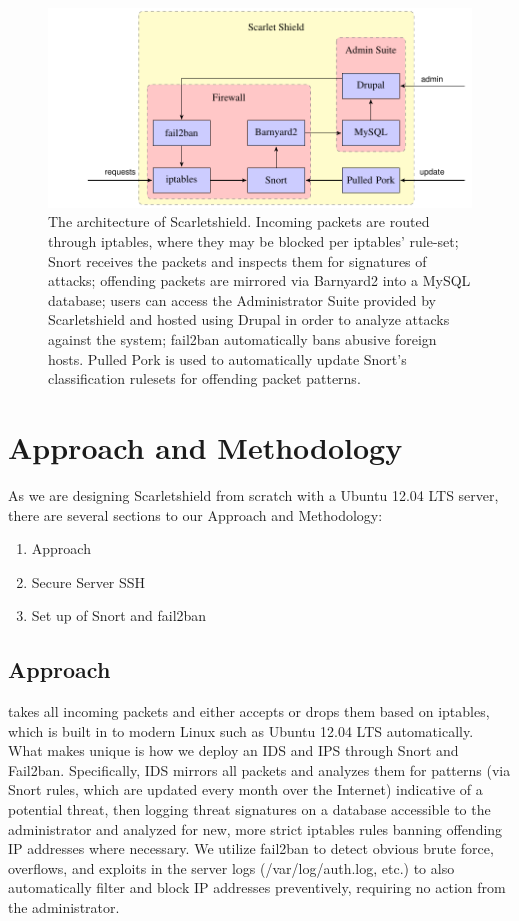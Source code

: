 \documentclass[12pt,letterpaper,titlepage]{report}
\begin{document}
{\begin{figure}[h]
\centering
  \includegraphics{./scarlet-shield-diagram2.pdf}
  \caption{The architecture of Scarletshield. Incoming packets are routed
  through iptables, where they may be blocked per iptables' rule-set; Snort receives
  the packets and inspects them for signatures of attacks; offending packets are 
  mirrored via Barnyard2 into a MySQL database; users can access the Administrator
  Suite provided by Scarletshield and hosted using Drupal in order to analyze
  attacks against the system; fail2ban automatically bans abusive foreign hosts. 
  Pulled Pork is used to automatically update Snort's classification rulesets
  for offending packet patterns.}
\end{figure}

\chapter{Approach and Methodology}

As we are designing Scarletshield from scratch with a Ubuntu 12.04 LTS server,
there are several sections to our Approach and Methodology:

\begin{enumerate}
\itemsep0em
\item Approach
\item Secure Server SSH
\item Set up of Snort and fail2ban
\end{enumerate}

\section{Approach}

\scarletshield takes all incoming packets and either accepts or drops them based
on iptables, which is built in to modern Linux \distros such as Ubuntu 12.04 LTS
automatically.  What makes \scarletshield unique is how we deploy an IDS and IPS
through Snort and Fail2ban.  Specifically, IDS mirrors all packets and analyzes
them for patterns (via Snort rules, which are updated every month over the
Internet) indicative of a potential threat, then logging threat signatures on a
database accessible to the administrator and analyzed for new, more strict
iptables rules banning offending IP addresses where necessary.  We utilize
fail2ban to detect obvious brute force, overflows, and exploits in the server
logs (/var/log/auth.log, etc.) to also automatically filter and block IP
addresses preventively, requiring no action from the administrator.

}
\end{document}
